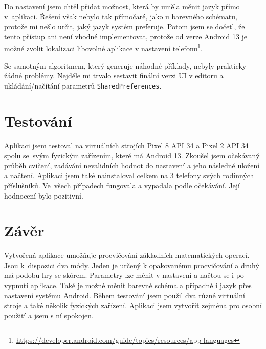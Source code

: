 \documentclass[12pt]{report}
\begin{document}
	Do nastavení jsem chtěl přidat možnost, která by uměla měnit jazyk přímo v~aplikaci. Řešení však nebylo tak přímočaré, jako u barevného schématu, protože mi nešlo určit, jaký jazyk systém preferuje. Potom jsem se dočetl, že tento přístup ani není vhodné implementovat, protože od verze Android 13 je možné zvolit lokalizaci libovolné aplikace v nastavení telefonu\footnote{\url{https://developer.android.com/guide/topics/resources/app-languages}}.

	Se samotným algoritmem, který generuje náhodné příklady, nebyly prakticky žádné problémy. Nejdéle mi trvalo sestavit finální verzi UI v editoru a ukládání/načítání parametrů \texttt{SharedPreferences}.

	\chapter{Testování}
	Aplikaci jsem testoval na virtuálních strojích Pixel 8 API 34 a Pixel 2 API 34 spolu se~svým fyzickým zařízením, které má Android 13. Zkoušel jsem očekávaný průběh cvičení, zadávání nevalidních hodnot do nastavení a jeho následné uložení a načtení. Aplikaci jsem také nainstaloval celkem na 3 telefony svých rodinných příslušníků. Ve~všech případech fungovala a vypadala podle očekávání. Její hodnocení bylo pozitivní.
	

	\chapter{Závěr}
	Vytvořená aplikace umožňuje procvičování základních matematických operací. Jsou k~dispozici dva módy. Jeden je určený k opakovanému procvičování a druhý má podobu hry se skórem. Parametry lze měnit v nastavení a načtou se i po vypnutí aplikace. Také je možné měnit barevné schéma a případně i jazyk přes nastavení systému Android. Během testování jsem použil dva různé virtuální stroje a také několik fyzických zařízení. Aplikaci jsem vytvořit zejména pro osobní použití a jsem s ní spokojen.
	
	
	
\end{document}
